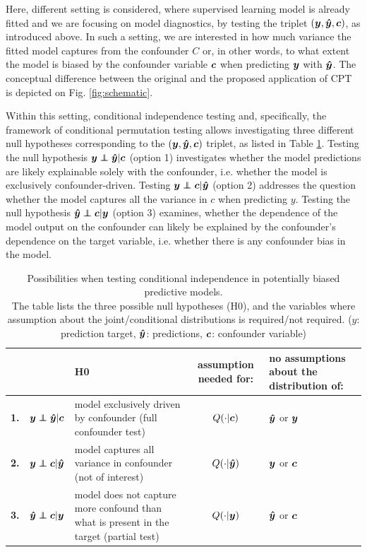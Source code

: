 \documentclass{article}
\begin{document}
Here, different setting is considered, where supervised learning model is already fitted and we are focusing on model diagnostics, by testing the triplet $(\boldsymbol{y},\boldsymbol{\hat{y}}, \boldsymbol{c})$, as introduced above. In such a setting, we are interested in how much variance the fitted model captures from the confounder $C$ or, in other words, to what extent the model is biased by the confounder variable $\boldsymbol{c}$ when predicting $\boldsymbol{y}$ with $\boldsymbol{\hat{y}}$. The conceptual difference between the original and the proposed application of CPT is depicted on Fig. \ref{fig:schematic}.

Within this setting, conditional independence testing and, specifically, the framework of conditional permutation testing allows investigating three different null hypotheses corresponding to the $(\boldsymbol{y}, \boldsymbol{\hat{y}}, \boldsymbol{c})$ triplet, as listed in Table \ref{tab:conditional-independence-cases}. Testing the null hypothesis $\y \independent \yhat | \c$ (option 1) investigates whether the model predictions are likely explainable solely with the confounder, i.e. whether the model is exclusively confounder-driven. Testing $\y \independent \c | \yhat$ (option 2) addresses the question whether the model captures all the variance in $c$ when predicting $y$. Testing the null hypothesis $\yhat \independent \c | \y$ (option 3) examines, whether the dependence of the model output on the confounder can likely be explained by the confounder's dependence on the target variable, i.e. whether there is any confounder bias in the model.

\renewcommand{\arraystretch}{1.2}
\begin{table}[]
\centering
\begin{tabular}{l|rp{60mm}|c|>{\centering\arraybackslash}m{30mm}}
 &  & H0  & assumption needed for: & no assumptions about the distribution of: \\
\hline
\textbf{1.} & $\y \independent \yhat | \c$ \quad  & model exclusively driven by confounder (full confounder test) & $Q(\cdot|\boldsymbol{c})$ & $\boldsymbol{\hat{y}}$ or $\boldsymbol{y}$ \\
\textbf{2.} & $\y \independent \c | \yhat$ \quad & model captures all variance in confounder (not of interest) & $Q(\cdot|\boldsymbol{\hat{y}})$ & $\boldsymbol{y}$ or $\boldsymbol{c}$ \\
\textbf{3.} & $\yhat \independent \c | \y$  \quad &  model does not capture more confound than what is present in the target (partial test) & $Q(\cdot|\boldsymbol{y})$ & $\boldsymbol{\hat{y}}$ or $\boldsymbol{c}$ \\
\end{tabular}
\caption{\label{tab:conditional-independence-cases} Possibilities when testing conditional independence in potentially biased predictive models. \\The table lists the three possible null hypotheses (H0), and the variables where assumption about the joint/conditional distributions is required/not required.   ($y$: prediction target, $\boldsymbol{\hat{y}}$: predictions, $\boldsymbol{c}$: confounder variable) }
\end{table}
\end{document}
